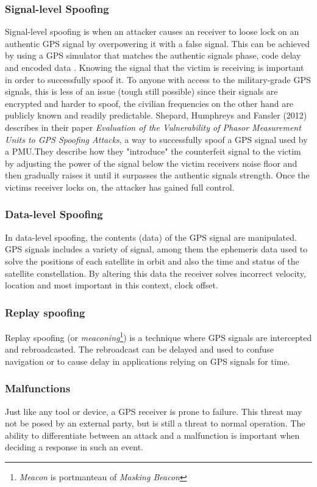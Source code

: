 \documentclass[12pt,english,a4paper]{article}
\begin{document}
\subsubsection{Signal-level Spoofing}\label{sls}
Signal-level spoofing is when an attacker causes an receiver to loose lock on an authentic GPS signal by overpowering it with a false signal. This can be achieved by using a GPS simulator that matches the authentic signals phase, code delay and encoded data \cite{SGRCOOPMU}. Knowing the signal that the victim is receiving is important in order to successfully spoof it. To anyone with access to the military-grade GPS signals, this is less of an issue (tough still possible) since their signals are encrypted and harder to spoof, the civilian frequencies on the other hand are publicly known and readily predictable. Shepard, Humphreys and Fansler (2012)\cite{EVPMUGA} describes in their paper \textit{Evaluation of the Vulnerability of Phasor Measurement Units to GPS Spoofing Attacks}, a way to successfully spoof a GPS signal used by a PMU.They describe how they "introduce" the counterfeit signal to the victim by adjusting the power of the signal below the victim receivers noise floor and then gradually raises it until it surpasses the authentic signals strength. Once the victims receiver locks on, the attacker has gained full control.

\subsubsection{Data-level Spoofing}\label{dls}
In data-level spoofing, the contents (data) of the GPS signal are manipulated. GPS signals includes a variety of signal, among them the ephemeris data used to solve the positions of each satellite in orbit and also the time and status of the satellite constellation. By altering this data the receiver solves incorrect velocity, location and most important in this context, clock offset.\cite{SGRCOOPMU}

\subsubsection{Replay spoofing}\label{rs}
Replay spoofing (or \textit{meaconing}\footnote{\textit{Meacon} is portmanteau of \textit{Masking Beacon}}) is a technique where GPS signals are intercepted and rebroadcasted. The rebroadcast can be delayed and used to confuse navigation or to cause delay in applications relying on GPS signals for time.

\subsubsection{Malfunctions}\label{mf}
Just like any tool or device, a GPS receiver is prone to failure. This threat may not be posed by an external party, but is still a threat to normal operation. The ability to differentiate between an attack and a malfunction is important when deciding a response in such an event.
\end{document}
